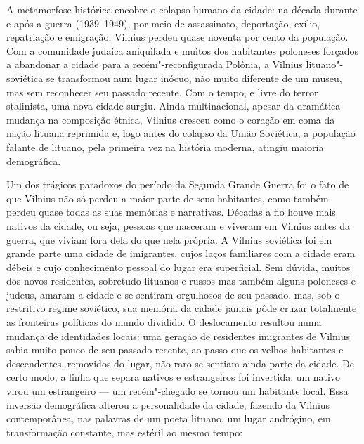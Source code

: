 %

A metamorfose histórica encobre o colapso humano da cidade: na década
durante e após a guerra (1939--1949), por meio de assassinato,
deportação, exílio, repatriação e emigração, Vilnius perdeu quase
noventa por cento da população. Com a comunidade judaica aniquilada e
muitos dos habitantes poloneses forçados a abandonar a cidade para a
recém"-reconfigurada Polônia, a Vilnius lituano"-soviética se transformou
num lugar inócuo, não muito diferente de um museu, mas sem reconhecer
seu passado recente. Com o tempo, e livre do terror stalinista, uma nova
cidade surgiu. Ainda multinacional, apesar da dramática mudança na
composição étnica, Vilnius cresceu como o coração em coma da nação
lituana reprimida e, logo antes do colapso da União Soviética, a
população falante de lituano, pela primeira vez na história moderna,
atingiu maioria demográfica.

Um dos trágicos paradoxos do período da Segunda Grande Guerra foi o fato
de que Vilnius não só perdeu a maior parte de seus habitantes, como
também perdeu quase todas as suas memórias e narrativas. Décadas a fio
houve mais nativos da cidade, ou seja, pessoas que nasceram e viveram em
Vilnius antes da guerra, que viviam fora dela do que nela própria. A
Vilnius soviética foi em grande parte uma cidade de imigrantes, cujos
laços familiares com a cidade eram débeis e cujo conhecimento pessoal do
lugar era superficial. Sem dúvida, muitos dos novos residentes,
sobretudo lituanos e russos mas também alguns poloneses e judeus, amaram
a cidade e se sentiram orgulhosos de seu passado, mas, sob o restritivo
regime soviético, sua memória da cidade jamais pôde cruzar totalmente as
fronteiras políticas do mundo dividido. O deslocamento resultou numa
mudança de identidades locais: uma geração de residentes imigrantes de
Vilnius sabia muito pouco de seu passado recente, ao passo que os velhos
habitantes e descendentes, removidos do lugar, não raro se sentiam ainda
parte da cidade. De certo modo, a linha que separa nativos e
estrangeiros foi invertida: um nativo virou um estrangeiro --- um
recém"-chegado se tornou um habitante local. Essa inversão demográfica
alterou a personalidade da cidade, fazendo da Vilnius contemporânea, nas
palavras de um poeta lituano, um lugar andrógino, em transformação
constante, mas estéril ao mesmo tempo:

